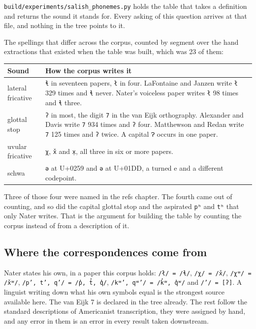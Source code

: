 \texttt{build/\allowbreak{}experiments/\allowbreak{}salish\_\allowbreak{}phonemes.\allowbreak{}py}
holds the table that takes a definition and returns the sound it stands for. Every asking of this
question arrives at that file, and nothing in the tree points to it.

The spellings that differ across the corpus, counted by segment over the hand extractions that
existed when the table was built, which was 23 of them:

\tiny
\setlength{\tabcolsep}{2pt}
\begin{longtable}{@{}>{\arraybackslash}p{}>{\arraybackslash}p{}@{}}
\toprule
Sound & How the corpus writes it \\
\midrule
lateral fricative & \texttt{ɬ} in seventeen papers, \texttt{ł} in four. LaFontaine and Janzen write \texttt{ł} 329 times and \texttt{ɬ} never. Nater's voiceless paper writes \texttt{ł} 98 times and \texttt{ɬ} three. \\
glottal stop & \texttt{ʔ} in most, the digit \texttt{7} in the van Eijk orthography. Alexander and Davis write \texttt{7} 934 times and \texttt{ʔ} four. Matthewson and Redan write \texttt{7} 125 times and \texttt{ʔ} twice. A capital \texttt{Ɂ} occurs in one paper. \\
uvular fricative & \texttt{χ}, \texttt{x̌} and \texttt{x̣}, all three in six or more papers. \\
schwa & \texttt{ə} at U+0259 and \texttt{ǝ} at U+01DD, a turned e and a different codepoint. \\
\bottomrule
\end{longtable}
\normalsize

Three of those four were named in the refs chapter. The fourth came out of counting, and so did the
capital glottal stop and the aspirated \texttt{pʰ} and \texttt{tʰ} that only Nater writes. That is
the argument for building the table by counting the corpus instead of from a description of it.

\subsection{Where the correspondences come from}

Nater states his own, in a paper this corpus holds: \texttt{/ł/ = /ɬ/}, \texttt{/χ/ = /x̌/},
\texttt{/χʷ/ = /x̌ʷ/}, \texttt{/p’, t’, q’/ = /p̓, t̓, q̓/}, \texttt{/kʷ’, qʷ’/ = /k̓ʷ, q̓ʷ/} and
\texttt{/’/ = [ʔ]}. A linguist writing down what his own symbols equal is the strongest source
available here. The van Eijk 7 is declared in the tree already. The rest follow the standard
descriptions of Americanist transcription, they were assigned by hand, and any error in them is an
error in every result taken downstream.

